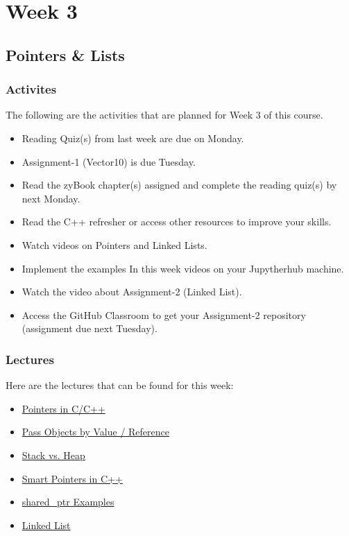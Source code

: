 \clearpage

\chapter{Week 3}

\section{Pointers \& Lists}

\horizontalline

\subsection{Activites}
The following are the activities that are planned for Week 3 of this course.
\begin{itemize}
    \item Reading Quiz(s) from last week are due on Monday.
    \item Assignment-1 (Vector10) is due Tuesday.
    \item Read the zyBook chapter(s) assigned and complete the reading quiz(s) by next Monday.
    \item Read the C++ refresher or access other resources to improve your skills.
    \item Watch videos on Pointers and Linked Lists.
    \item Implement the examples In this week videos on your Jupytherhub machine.
    \item Watch the video about Assignment-2 (Linked List).
    \item Access the GitHub Classroom to get your Assignment-2 repository  (assignment due next Tuesday).
\end{itemize}

\subsection{Lectures}
Here are the lectures that can be found for this week:
\begin{itemize}
    \item \href{https://applied.cs.colorado.edu/mod/hvp/view.php?id=45893}{Pointers in C/C++}
    \item \href{https://applied.cs.colorado.edu/mod/hvp/view.php?id=45894}{Pass Objects by Value / Reference}
    \item \href{https://applied.cs.colorado.edu/mod/hvp/view.php?id=45895}{Stack vs. Heap}
    \item \href{https://applied.cs.colorado.edu/mod/hvp/view.php?id=45896}{Smart Pointers in C++}
    \item \href{https://applied.cs.colorado.edu/mod/hvp/view.php?id=45897}{shared\_ptr Examples}
    \item \href{https://applied.cs.colorado.edu/mod/hvp/view.php?id=45898}{Linked List}
\end{itemize}

